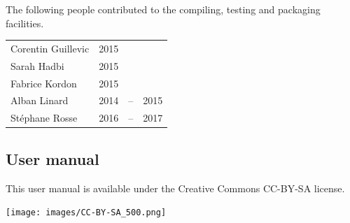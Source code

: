 \bigskip

The following people contributed to the compiling, testing and packaging facilities.

\begin{tabular}{l l @{ } c @{ } l}
	Corentin Guillevic & 2015 &    &      \\
	Sarah Hadbi        & 2015 &    &      \\
	Fabrice Kordon     & 2015 &    &      \\
	Alban Linard       & 2014 & -- & 2015 \\
	Stéphane Rosse     & 2016 & -- & 2017 \\
\end{tabular}


\bigskip

\subsection*{User manual}
This user manual is available under the Creative Commons CC-BY-SA license.

\begin{center}
	\texttt{[image: images/CC-BY-SA\_500.png]}
\end{center}










